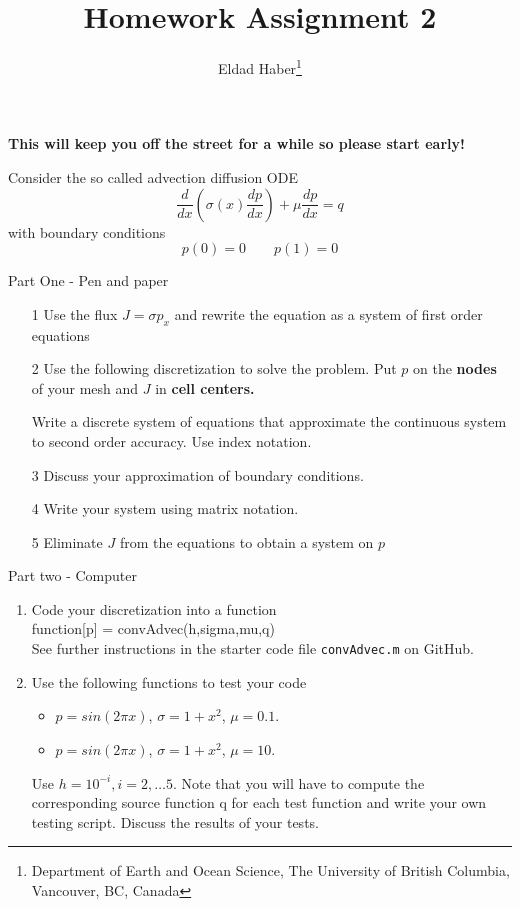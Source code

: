 \documentclass[12pt,legal]{article}
\begin{document}
\title{Homework Assignment 2}
\author{Eldad Haber\thanks{Department of Earth and Ocean Science, The University of British Columbia, Vancouver, BC, Canada}}

\maketitle

{\bf This will keep you off the street for a while so please start early!} 

\vspace{1cm}


Consider the so called advection diffusion  ODE
$$ {\frac {d}{dx}} \left( \sigma(x) {\frac {dp}{dx}}\right) + \mu {\frac {dp}{dx}} = q $$
with boundary conditions
$$p(0) = 0 \quad \quad p(1) = 0 $$

{\Large Part One - Pen and paper}
\begin{enumerate}
\item[1]
Use the flux $J = \sigma p_x$ and rewrite the
equation as a system of first order equations

\item[2]
Use the following discretization to solve the problem.
Put $p$ on the {\bf nodes} of your mesh and $J$ in {\bf cell centers.}

Write a discrete system of equations that approximate the continuous system to second order accuracy.
Use index notation.

\item[3]
Discuss your approximation of boundary conditions.

\item[4]
Write your system using matrix notation.

\item[5]
Eliminate $J$ from the equations to obtain a system on $p$

\end{enumerate}

{\Large Part two - Computer}
\begin{enumerate}
\item Code your discretization into a function \\
{\rm function[p] = convAdvec(h,sigma,mu,q)} \\
See further instructions in the starter code file \verb!convAdvec.m! on GitHub.

\item Use the following functions to test your code
\begin{itemize}
	\item $p = sin(2 \pi x)$, $\sigma = 1+x^2$, $\mu = 0.1$.
	\item $p = sin(2 \pi x)$, $\sigma = 1+x^2$, $\mu = 10$.
\end{itemize}
Use $h = 10^{-i}, i=2,\ldots 5$. Note that you will have to compute the corresponding source function q for each test function and write your own testing script. Discuss the results of your tests.

\end{enumerate}
\end{document}
